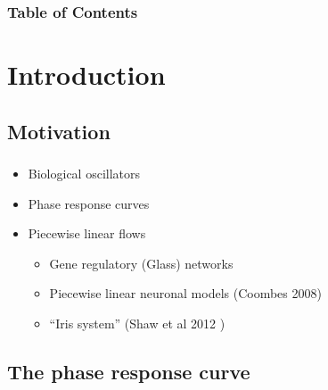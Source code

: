 \documentclass{beamer}
\begin{document}
\begin{frame}
\frametitle{Table of Contents}
\tableofcontents%
\end{frame}

\section{Introduction}
\subsection{Motivation}

\begin{frame}
  \frametitle{\insertsection}
  \framesubtitle{\insertsubsection}

  \begin{itemize}
  \item Biological oscillators
  \item Phase response curves
  \item Piecewise linear flows
  \begin{itemize}
  \item Gene regulatory (Glass) networks
  \item Piecewise linear neuronal models (Coombes 2008)
  \item ``Iris system'' (Shaw et al 2012 \cite{ShawParkChielThomas2012SIADS})%
  \end{itemize}
  \end{itemize}

\end{frame}
  
\subsection{The phase response curve}
\end{document}
